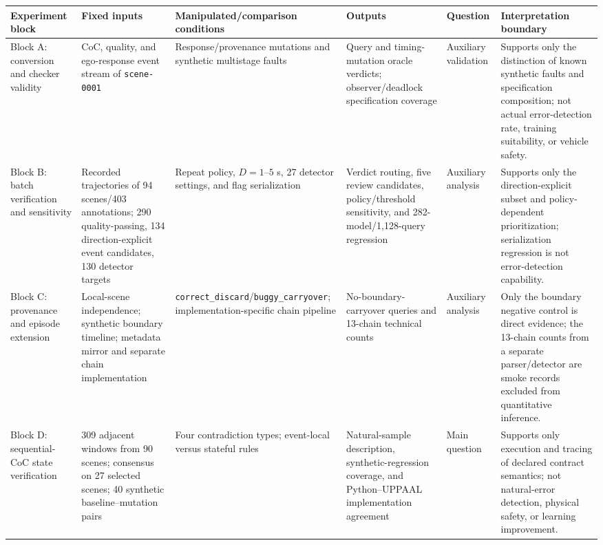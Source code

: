 \begin{table}[t]
\centering
{}
\label{tab:experiment-rq-map}
\begingroup
\scriptsize
\setlength{\tabcolsep}{2.5pt}
\renewcommand{\arraystretch}{0.90}
\begin{tabularx}{\textwidth}{@{}L{0.14\textwidth}L{0.19\textwidth}L{0.23\textwidth}L{0.18\textwidth}L{0.08\textwidth}Y@{}}
\toprule
Experiment block & Fixed inputs & Manipulated/comparison conditions & Outputs & Question & Interpretation boundary \\
\midrule
Block A: conversion and checker validity & CoC, quality, and ego-response event stream of \texttt{scene-0001} & Response/provenance mutations and synthetic multistage faults & Query and timing-mutation oracle verdicts; observer/deadlock specification coverage & Auxiliary validation & Supports only the distinction of known synthetic faults and specification composition; not actual error-detection rate, training suitability, or vehicle safety. \\
\midrule
Block B: batch verification and sensitivity & Recorded trajectories of 94 scenes/403 annotations; 290 quality-passing, 134 direction-explicit event candidates, 130 detector targets & Repeat policy, $D=1$--$5$ s, 27 detector settings, and flag serialization & Verdict routing, five review candidates, policy/threshold sensitivity, and 282-model/1,128-query regression & Auxiliary analysis & Supports only the direction-explicit subset and policy-dependent prioritization; serialization regression is not error-detection capability. \\
\midrule
Block C: provenance and episode extension & Local-scene independence; synthetic boundary timeline; metadata mirror and separate chain implementation & \texttt{correct\_discard}/\texttt{buggy\_carryover}; implementation-specific chain pipeline & No-boundary-carryover queries and 13-chain technical counts & Auxiliary analysis & Only the boundary negative control is direct evidence; the 13-chain counts from a separate parser/detector are smoke records excluded from quantitative inference. \\
\midrule
Block D: sequential-CoC state verification & 309 adjacent windows from 90 scenes; consensus on 27 selected scenes; 40 synthetic baseline--mutation pairs & Four contradiction types; event-local versus stateful rules & Natural-sample description, synthetic-regression coverage, and Python--UPPAAL implementation agreement & Main question & Supports only execution and tracing of declared contract semantics; not natural-error detection, physical safety, or learning improvement. \\
\bottomrule
\end{tabularx}
\endgroup
\end{table}
